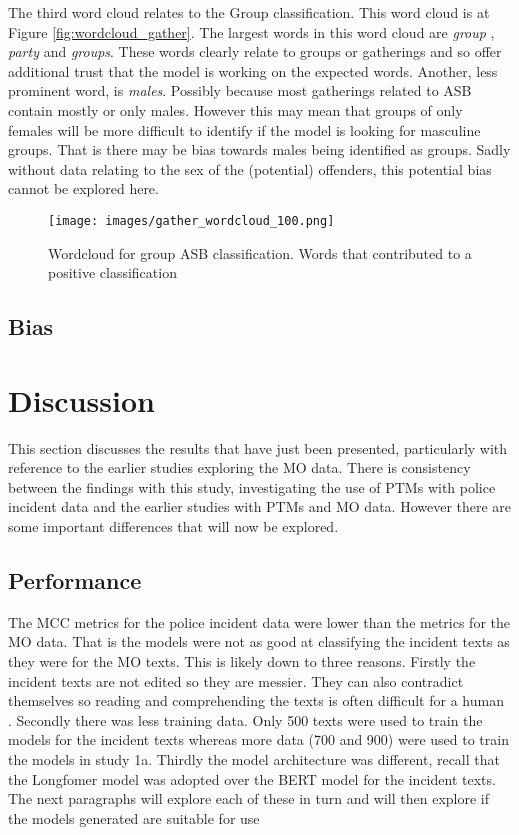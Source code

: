 The third word cloud relates to the Group classification. This word cloud is at Figure \ref{fig:wordcloud_gather}. The largest words in this word cloud are \emph{group} , \emph{party} and \emph{groups}. These words clearly relate to groups or gatherings and so offer additional trust that the model is working on the expected words. Another, less prominent word, is \emph{males}. Possibly because most gatherings related to ASB contain mostly or only males. However this may mean that groups of only females will be more difficult to identify if the model is looking for masculine groups. That is there may be bias towards males being identified as groups. Sadly without data relating to the sex of the (potential) offenders, this potential bias cannot be explored here. 


\begin{figure}[h]
    \texttt{[image: images/gather\_wordcloud\_100.png]}
    \caption{{Wordcloud for group ASB classification.} Words that contributed to a positive classification}
    \label{fig: wordcloud_gather}
\end{figure}
   


\subsection{Bias}




\section{Discussion} This section discusses the results that have just been presented, particularly with reference to the earlier studies exploring the MO data.  There is consistency between the findings with this study, investigating the use of PTMs with police incident data and the earlier studies with PTMs and MO data. However there are some important differences that will now be explored.


\subsection{Performance} The MCC metrics for the police incident data were lower than the metrics for the MO data. That is the models were not as good at classifying the incident texts as they were for the MO texts. This is likely down to three reasons. Firstly the incident texts are not edited so they are messier. They can also contradict themselves so reading and comprehending the texts is often difficult for a human . Secondly there was less training data. Only 500 texts were used to train the models for the incident texts whereas more data (700 and 900) were used to train the models in study 1a. Thirdly the model architecture was different, recall that the Longfomer model was adopted over the BERT model for the incident texts. The next paragraphs will explore each of these in turn and will then explore if the models generated are suitable for use

